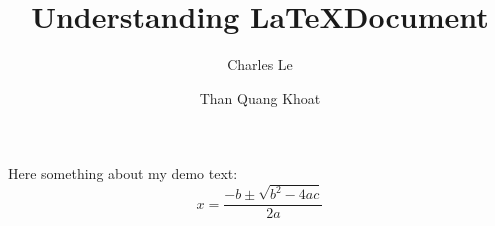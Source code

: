 \documentclass{article} %
\title{Understanding \LaTeX Document} %
\author{Charles Le \and Than Quang Khoat} %
\date{} %
\begin{document}
\maketitle %
Here something about my demo text:
\[ x=\frac{-b\pm\sqrt{b^2-4ac}}{2a} \] \\ %
\end{document}
